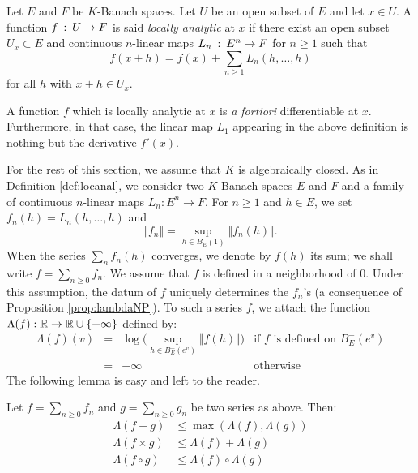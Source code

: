 \documentclass{lms}
\begin{document}
\begin{deftn}
\label{def:locanal}
Let $E$ and $F$ be $K$-Banach spaces. Let $U$ be an open subset of $E$
and let $x \in U$.
A function $f \: : \: U \rightarrow F$ is said \emph{locally analytic} at 
$x$ if there exist an open subset $U_x \subset E$ and continuous $n$-linear
maps $L_n \: : \: E^n \rightarrow F$ for $n \ge 1$ such that
\[
f(x+h) = f(x) + \sum_{n \geq 1} L_n(h,\ldots,h)
\]
for all $h$ with $x + h \in U_x$.
\end{deftn}

\begin{rmk}
A function $f$ which is locally analytic at $x$ is \emph{a fortiori} 
differentiable at $x$. Furthermore, in that case, the linear map $L_1$ 
appearing in the above definition is nothing but the derivative $f'(x)$.
\end{rmk}

For the rest of this section, we assume that $K$ is algebraically closed. As in Definition 
\ref{def:locanal}, we consider two $K$-Banach spaces $E$ and $F$ and a 
family of continuous $n$-linear maps $L_n : E^n \to F$. For $n \ge 1$ 
and $h \in E$, we set $f_n(h) = L_n(h, \ldots, h)$ and
$$\Vert f_n \Vert = \sup_{h \in B_E(1)} \Vert f_n(h) \Vert.$$
When the series $\sum_n f_n(h)$ converges, we denote by $f(h)$ its sum;
we shall write $f = \sum_{n \geq 0} f_n$. We assume that $f$ is defined
in a neighborhood of $0$. Under this assumption, the datum of $f$ 
uniquely determines the $f_n$'s (a consequence of Proposition 
\ref{prop:lambdaNP}).
To such a series $f$, we attach the function $\Lambda(f) : \mathbb R \to \mathbb R 
\cup \{+\infty\}$ defined by:
$$\begin{array}{rcll}
\Lambda(f)(v) & = & 
\log \big( \sup_{h \in B^-_E(e^v)} \Vert f(h) \Vert \big)
& \text{if } f \text{ is defined on } B^-_E(e^v) \\
& = & +\infty & \text{otherwise}
\end{array}$$
The following lemma is easy and left to the reader.

\begin{lem}
\label{lem:opLambda}
Let $f = \sum_{n \geq 0} f_n$ and $g = \sum_{n \geq 0} g_n$ be two 
series as above. Then:
\begin{align*}
\Lambda(f+g) &\leq \max (\Lambda(f),\Lambda(g)) \\
\Lambda(f \times g) &\leq \Lambda(f)+\Lambda(g) \\
\Lambda(f \circ g) &\leq \Lambda(f) \circ \Lambda(g)
\end{align*}
\end{lem}
\end{document}
